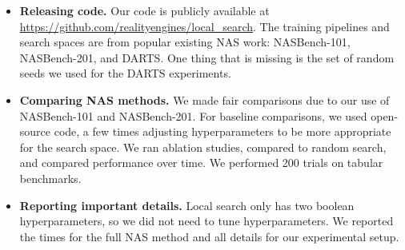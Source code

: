\documentclass[11pt]{article}
\numberwithin{equation}{section}
\numberwithin{figure}{section}
\theoremstyle{plain}
\theoremstyle{definition}
\begin{document}
\begin{itemize}
    \item \textbf{Releasing code.}
    Our code is publicly available at\\ \url{https://github.com/realityengines/local\_search}.
    The training pipelines and search spaces are from popular existing NAS work:
    NASBench-101, NASBench-201, and DARTS.
    One thing that is missing is the set of random seeds we used for the DARTS experiments.
    \item \textbf{Comparing NAS methods.}
    We made fair comparisons due to our use of NASBench-101 and NASBench-201.
    For baseline comparisons, we used open-source code, a few times adjusting hyperparameters
    to be more appropriate for the search space.
    We ran ablation studies, compared to random search, and compared performance over time.
    We performed 200 trials on tabular benchmarks.
    \item \textbf{Reporting important details.}
    Local search only has two boolean hyperparameters, so we did not need to tune
    hyperparameters. We reported the times for the full NAS method and all details for
    our experimental setup.
\end{itemize}

 
\end{document}
